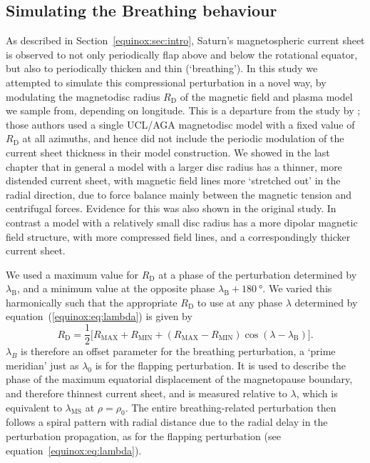 \subsection{Simulating the Breathing behaviour}\label{equinox:sec:simulatingbreathing}
As described in Section~\ref{equinox:sec:intro}, Saturn's magnetospheric current sheet is observed to not only periodically flap above and below the rotational equator, but also to periodically thicken and thin (`breathing'). In this study we attempted to simulate this compressional perturbation in a novel way, by modulating the magnetodisc radius $R_\mathrm{D}$ of the magnetic field and plasma model we sample from, depending on longitude. This is a departure from the study by {\citet{achilleos2014}}; those authors used a single UCL/AGA magnetodisc model with a fixed value of $R_\mathrm{D}$ at all azimuths, and hence did not include the periodic modulation of the current sheet thickness in their model construction. We showed in the last chapter that in general a model with a larger disc radius has a thinner, more distended current sheet, with magnetic field lines more `stretched out' in the radial direction, due to force balance mainly between the magnetic tension and centrifugal forces. Evidence for this was also shown in the original \citet{achilleos2010a} study. In contrast a model with a relatively small disc radius has a more dipolar magnetic field structure, with more compressed field lines, and a correspondingly thicker current sheet.

We used a maximum value for $R_\mathrm{D}$ at a phase of the perturbation determined by $\lambda_\mathrm{B}$, and a minimum value at the opposite phase $\lambda_\mathrm{B}+\SI{180}{\degree}$. We varied this harmonically such that the appropriate $R_\mathrm{D}$ to use at any phase $\lambda$ determined by equation~(\ref{equinox:eq:lambda}) is given by
\begin{equation}\label{equinox:eq:RD}
R_\mathrm{D} = \frac{1}{2}\big[ R_\mathrm{MAX}+R_\mathrm{MIN}+(R_\mathrm{MAX}-R_\mathrm{MIN})\cos{(\lambda - \lambda_\mathrm{B})}\big].
\end{equation}
$\lambda_B$ is therefore an offset parameter for the breathing perturbation, a `prime meridian' just as $\lambda_0$ is for the flapping perturbation. It is used to describe the phase of the maximum equatorial displacement of the magnetopause boundary, and therefore thinnest current sheet, and is measured relative to $\lambda$, which is equivalent to $\lambda_\mathrm{MS}$ at $\rho=\rho_0$. The entire breathing-related perturbation then follows a spiral pattern with radial distance due to the radial delay in the perturbation propagation, as for the flapping perturbation (see equation~\ref{equinox:eq:lambda}).

